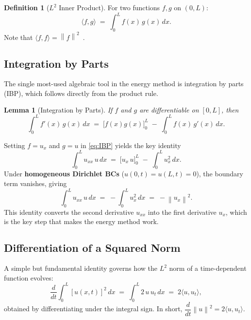 \documentclass[12pt,a4paper]{article}
\theoremstyle{plain}
\newtheorem{lemma}[theorem]{Lemma}
\theoremstyle{definition}
\newtheorem{definition}[theorem]{Definition}
\newcommand{\norm}[1]{\left\lVert #1 \right\rVert}
\newcommand{\ddt}{\dfrac{d}{dt}}
\begin{document}
\begin{definition}[$L^2$ Inner Product]
  For two functions $f,g$ on $(0,L)$:
  \begin{equation}
    \langle f,g\rangle \;=\; \int_0^L f(x)\,g(x)\,dx.
    \label{eq:inner}
  \end{equation}
  Note that $\langle f,f\rangle = \norm{f}^2$~\cite{Hardy}.
\end{definition}

\subsection{Integration by Parts}

The single most-used algebraic tool in the energy method is integration by
parts (IBP), which follows directly from the product rule.

\begin{lemma}[Integration by Parts]
  If $f$ and $g$ are differentiable on $[0,L]$, then
  \begin{equation}
    \int_0^L f'(x)\,g(x)\,dx \;=\; \bigl[f(x)g(x)\bigr]_0^L
    \;-\; \int_0^L f(x)\,g'(x)\,dx.
    \label{eq:IBP}
  \end{equation}
\end{lemma}

Setting $f=u_x$ and $g=u$ in \eqref{eq:IBP} yields the key identity
\begin{equation}
  \int_0^L u_{xx}\,u\,dx \;=\; \bigl[u_x\,u\bigr]_0^L \;-\; \int_0^L u_x^2\,dx.
  \label{eq:IBP-key}
\end{equation}
Under \textbf{homogeneous Dirichlet BCs} ($u(0,t)=u(L,t)=0$), the boundary
term vanishes, giving
\begin{equation}
  \int_0^L u_{xx}\,u\,dx \;=\; -\int_0^L u_x^2\,dx \;=\; -\norm{u_x}^2.
  \label{eq:IBP-dirichlet}
\end{equation}
This identity converts the second derivative $u_{xx}$ into the first derivative
$u_x$, which is the key step that makes the energy method work.

\subsection{Differentiation of a Squared Norm}

A simple but fundamental identity governs how the $L^2$ norm of a time-dependent
function evolves:
\begin{equation}
  \ddt \int_0^L [u(x,t)]^2\,dx \;=\; \int_0^L 2\,u\,u_t\,dx \;=\; 2\langle u,u_t\rangle,
  \label{eq:norm-deriv}
\end{equation}
obtained by differentiating under the integral sign. In short,
$\dfrac{d}{dt}\norm{u}^2 = 2\langle u,u_t\rangle$.
\end{document}
